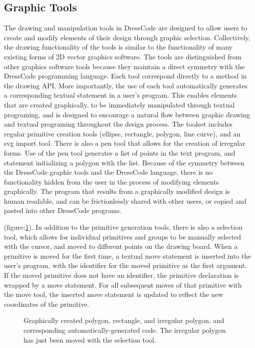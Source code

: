 \documentclass{sigchi}
\begin{document}
\subsection{Graphic Tools}
\label{subsec:graphic_tools_test}
The drawing and manipulation tools in DressCode are designed to allow users to create and modify elements of their design through graphic selection. Collectively, the drawing functionality of the tools is similar to the functionality of many existing forms of  2D vector graphics software. The tools are distinguished from other graphics software tools because they maintain a direct symmetry with the DressCode programming language. Each tool correspond directly to a method in the drawing API. More importantly, the use of each tool automatically generates a corresponding textual statement in a user's program. This enables elements that are created graphically, to be immediately manipulated through textual programing, and is designed to encourage a natural flow between graphic drawing and textual programing throughout the design process. The toolset includes regular primitive creation tools (ellipse, rectangle, polygon, line curve), and an svg import tool. There is also a pen tool that allows for the creation of irregular forms. Use of the pen tool generates a list of points in the text program, and statement initializing a polygon with the list. Because of the symmetry between the DressCode graphic tools and the DressCode language, there is no functionality hidden from the user in the process of modifying elements graphically. The program that results from a graphically modified design is human readable, and can be frictionlessly shared with other users, or copied and pasted into other DressCode programs.

(figure:\ref{fig:auto_generated_code}). In addition to the primitive generation tools, there is also a selection tool, which allows for individual primitives and groups to be manually selected with the cursor, and moved to different points on the drawing board. When a primitive is moved for the first time, a textual move statement is inserted into the user's program, with the identifier for the moved primitive as the first argument. If the moved primitive does not have an identifier, the primitive declaration is wrapped by a move statement. For all subsequent moves of that primitive with the move tool, the inserted move statement is updated to reflect the new coordinates of the primitive. %

\begin{center}
\begin{figure}[h!]
\caption{Graphically created polygon, rectangle, and irregular polygon, and corresponding automatically-generated code. The irregular polygon has just been moved with the selection tool.}
\label{fig:auto_generated_code}
\end{figure}
\end{center}
\end{document}
